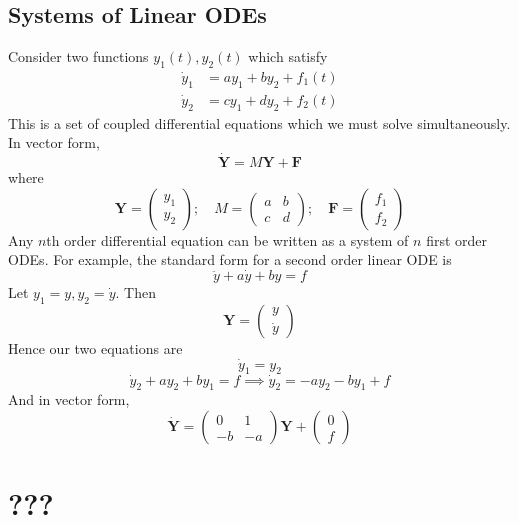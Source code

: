 \documentclass{article}
\begin{document}
\subsection{Systems of Linear ODEs}
Consider two functions $y_1(t), y_2(t)$ which satisfy
\begin{align*}
	\dot y_1 & = ay_1 + by_2 + f_1(t) \\
	\dot y_2 & = cy_1 + dy_2 + f_2(t)
\end{align*}
This is a set of coupled differential equations which we must solve simultaneously. In vector form,
\[ \dot{\bm Y} = M\bm Y + \bm F \]
where
\[ \bm Y = \begin{pmatrix}
		y_1 \\ y_2
	\end{pmatrix};\quad M = \begin{pmatrix}
		a & b \\ c & d
	\end{pmatrix};\quad \bm F = \begin{pmatrix}
		f_1 \\ f_2
	\end{pmatrix} \]
Any $n$th order differential equation can be written as a system of $n$ first order ODEs. For example, the standard form for a second order linear ODE is
\[ \ddot y + a\dot y + by = f \]
Let $y_1 = y, y_2 = \dot y$. Then
\[ \bm Y = \begin{pmatrix}
		y \\ \dot y
	\end{pmatrix} \]
Hence our two equations are
\[ \dot y_1 = y_2 \]
\[ \dot y_2 + ay_2 + by_1 = f \implies \dot y_2 = -ay_2 - by_1 + f \]
And in vector form,
\[ \dot{\bm Y} = \begin{pmatrix}
		0  & 1  \\
		-b & -a
	\end{pmatrix} \bm Y + \begin{pmatrix}
		0 \\ f
	\end{pmatrix} \]

\section{???}
\end{document}
